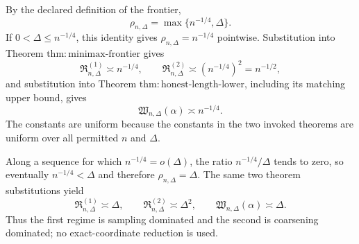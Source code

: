 By the declared definition of the frontier,
\[
 \rho_{n,\Delta}=\max\{n^{-1/4},\Delta\}.
\]
If \(0<\Delta\leq n^{-1/4}\), this identity gives \(\rho_{n,\Delta}=n^{-1/4}\) pointwise.  Substitution into Theorem \(\mathrm{thm:minimax\text{-}frontier}\) gives
\[
 \mathfrak R^{(1)}_{n,\Delta}\asymp n^{-1/4},
 \qquad
 \mathfrak R^{(2)}_{n,\Delta}\asymp(n^{-1/4})^2=n^{-1/2},
\]
and substitution into Theorem \(\mathrm{thm:honest\text{-}length\text{-}lower}\), including its matching upper bound, gives
\[
 \mathfrak W_{n,\Delta}(\alpha)\asymp n^{-1/4}.
\]
The constants are uniform because the constants in the two invoked theorems are uniform over all permitted \(n\) and \(\Delta\).

Along a sequence for which \(n^{-1/4}=o(\Delta)\), the ratio \(n^{-1/4}/\Delta\) tends to zero, so eventually \(n^{-1/4}<\Delta\) and therefore \(\rho_{n,\Delta}=\Delta\).  The same two theorem substitutions yield
\[
 \mathfrak R^{(1)}_{n,\Delta}\asymp\Delta,
 \qquad
 \mathfrak R^{(2)}_{n,\Delta}\asymp\Delta^2,
 \qquad
 \mathfrak W_{n,\Delta}(\alpha)\asymp\Delta.
\]
Thus the first regime is sampling dominated and the second is coarsening dominated; no exact-coordinate reduction is used.